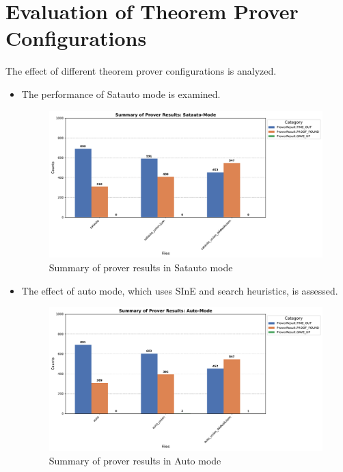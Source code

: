 \documentclass[english,version-2020-11]{uzl-thesis}
\begin{document}
\clearpage

\section{Evaluation of Theorem Prover Configurations}

The effect of different theorem prover configurations is analyzed.

\begin{itemize}
    \item The performance of Satauto mode is examined.
    \begin{figure}[h!]
        \centering
        \includegraphics[width=\textwidth]{satauto_mode_output.pdf}
        \caption{Summary of prover results in Satauto mode}
        \label{fig:prover_results_satauto}
    \end{figure}
    \FloatBarrier

    \item The effect of auto mode, which uses SInE and search heuristics, is assessed.
    \begin{figure}[h!]
        \centering
        \includegraphics[width=\textwidth]{auto_mode_output.pdf}
        \caption{Summary of prover results in Auto mode}
        \label{fig:prover_results_auto}
    \end{figure}
    \FloatBarrier
\end{itemize}
\end{document}
